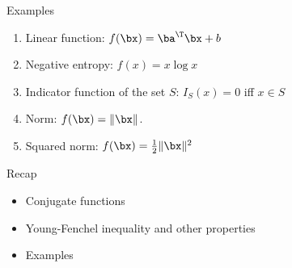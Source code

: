\documentclass[12pt]{beamer}
\begin{document}
\begin{frame}{Examples}
\begin{enumerate}
\item Linear function: $f(\bx) = \ba^{\T}\bx + b$
\item Negative entropy: $f(x) = x\log x$
\item Indicator function of the set $S$: $I_S(x) = 0$ iff $x \in S$
\item Norm: $f(\bx) = \|\bx\|$.
\item Squared norm: $f(\bx) = \frac{1}{2}\|\bx\|^2$
\end{enumerate}
\end{frame}

\begin{frame}{Recap}

\begin{itemize}
\item Conjugate functions
\item Young-Fenchel inequality and other properties
\item Examples
\end{itemize}

\end{frame}
\end{document}
